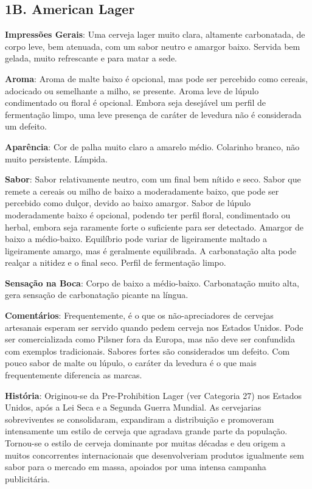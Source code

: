 \subsection*{1B. American Lager}
\textbf{Impressões Gerais}: Uma cerveja lager muito clara, altamente carbonatada, de corpo leve, bem atenuada, com um sabor neutro e amargor baixo. Servida bem gelada, muito refrescante e para matar a sede.

\textbf{Aroma}: Aroma de malte baixo é opcional, mas pode ser percebido como cereais, adocicado ou semelhante a milho, se presente. Aroma leve de lúpulo condimentado ou floral é opcional. Embora seja desejável um perfil de fermentação limpo, uma leve presença de caráter de levedura não é considerada um defeito.

\textbf{Aparência}: Cor de palha muito claro a amarelo médio. Colarinho branco, não muito persistente. Límpida.

\textbf{Sabor}: Sabor relativamente neutro, com um final bem nítido e seco. Sabor que remete a cereais ou milho de baixo a moderadamente baixo, que pode ser percebido como dulçor, devido ao baixo amargor. Sabor de lúpulo moderadamente baixo é opcional, podendo ter perfil floral, condimentado ou herbal, embora seja raramente forte o suficiente para ser detectado. Amargor de baixo a médio-baixo. Equilíbrio pode variar de ligeiramente maltado a ligeiramente amargo, mas é geralmente equilibrada. A carbonatação alta pode realçar a nitidez e o final seco. Perfil de fermentação limpo.

\textbf{Sensação na Boca}: Corpo de baixo a médio-baixo. Carbonatação muito alta, gera sensação de carbonatação picante na língua.

\textbf{Comentários}: Frequentemente, é o que os não-apreciadores de cervejas artesanais esperam ser servido quando pedem cerveja nos Estados Unidos. Pode ser comercializada como Pilsner fora da Europa, mas não deve ser confundida com exemplos tradicionais. Sabores fortes são considerados um defeito. Com pouco sabor de malte ou lúpulo, o caráter da levedura é o que mais frequentemente diferencia as marcas.

\textbf{História}: Originou-se da Pre-Prohibition Lager (ver Categoria 27) nos Estados Unidos, após a Lei Seca e a Segunda Guerra Mundial. As cervejarias sobreviventes se consolidaram, expandiram a distribuição e promoveram intensamente um estilo de cerveja que agradava grande parte da população. Tornou-se o estilo de cerveja dominante por muitas décadas e deu origem a muitos concorrentes internacionais que desenvolveriam produtos igualmente sem sabor para o mercado em massa, apoiados por uma intensa campanha publicitária.


